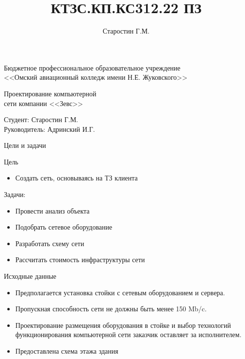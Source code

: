 \documentclass[aspectratio=169]{beamer}
\title{КТЗС.КП.КС312.22 ПЗ}
\author{Старостин Г.М.}
\begin{document}
	
\begin{frame}
	\centering
	 \begin{center}
		Бюджетное профессиональное образовательное учреждение\\
		<<Омский авиационный колледж имени Н.Е. Жуковского>>
	 \end{center}
	 
	 \vspace{1cm}
	 
	 \parbox{0.8\textwidth}{ 
	 	\fontsize{18}{19}\selectfont
	 	\centering
	 	Проектирование компьютерной\\
	 	сети компании <<Зевс>>
	 }
	 \vspace{2cm}
	 \begin{flushleft}
	 	Студент: Старостин Г.М. \\
	 	Руководитель: Адринский И.Г.
	 \end{flushleft}
	 \vspace{0.5cm}
\end{frame}
	
\begin{frame}{Цели и задачи}
	\begin{block}{\large Цель}
		\begin{itemize}
			\item Создать сеть, основываясь на ТЗ клиента
		\end{itemize}
	\end{block}
	
	\vspace{0.5cm}
	
	\begin{block}{\large Задачи:}
		\begin{itemize}
			\item Провести анализ объекта
			\item Подобрать сетевое оборудование
			\item Разработать схему сети
			\item Рассчитать стоимость инфраструктуры сети
		\end{itemize}
	\end{block}
	
\end{frame}

\begin{frame}{Исходные данные}
	\begin{itemize}
		\item Предполагается установка стойки с сетевым оборудованием и сервера.
		\item Пропускная способность сети не должны быть менее 150 Mb/c.
		\item Проектирование размещения оборудования в стойке и выбор технологий функционирования компьютерной сети заказчик оставляет за исполнителем.
		\item Предоставлена схема этажа здания
	\end{itemize}
\end{frame}
\end{document}
